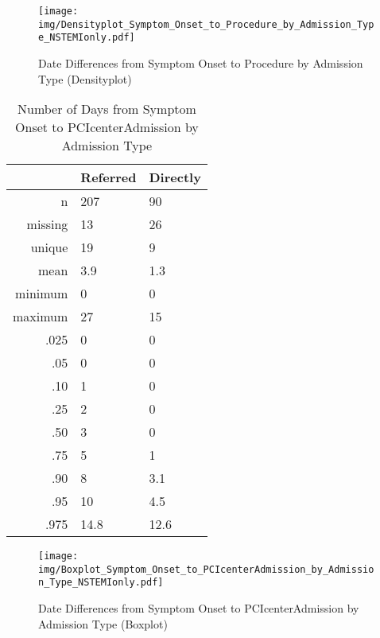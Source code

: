 \documentclass[presentation,xcolor=pdftex,dvipsnames,table,11pt]{beamer}
\begin{document}
\begin{tiny}
\begin{frame}
\begin{figure}
  \centering
  \caption{Date Differences from Symptom Onset to Procedure by Admission Type (Densityplot)}
  \label{Density: Date Differences from Symptom Onset to Procedure by Admission Type}
\texttt{[image: img/Densityplot\_Symptom\_Onset\_to\_Procedure\_by\_Admission\_Type\_NSTEMIonly.pdf]}\end{figure}
\end{frame}




\begin{table}[ht]
\centering
\begin{tabular}{rll}
  \toprule
 & Referred & Directly \\ 
  \midrule
n & 207 & 90 \\ 
  missing & 13 & 26 \\ 
  unique & 19 & 9 \\ 
  mean & 3.9 & 1.3 \\ 
  minimum & 0 & 0 \\ 
  maximum & 27 & 15 \\ 
  .025 & 0 & 0 \\ 
  .05 & 0 & 0 \\ 
  .10 & 1 & 0 \\ 
  .25 & 2 & 0 \\ 
  .50 & 3 & 0 \\ 
  .75 & 5 & 1 \\ 
  .90 & 8 & 3.1 \\ 
  .95 & 10 & 4.5 \\ 
  .975 & 14.8 & 12.6 \\ 
   \bottomrule
\end{tabular}
\caption{Number of Days from Symptom Onset to PCIcenterAdmission by Admission Type} 
\end{table}
\begin{frame}
\begin{figure}
  \centering
  \caption{Date Differences from Symptom Onset to PCIcenterAdmission by Admission Type (Boxplot)}
  \label{Boxplot: Date Differences from Symptom Onset to PCIcenterAdmission by Admission Type}
\texttt{[image: img/Boxplot\_Symptom\_Onset\_to\_PCIcenterAdmission\_by\_Admission\_Type\_NSTEMIonly.pdf]}\end{figure}
\end{frame}



\end{tiny}
\end{document}
